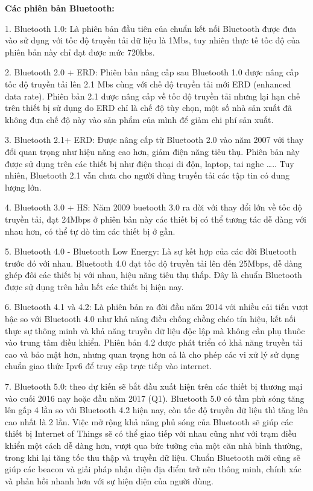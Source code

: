 \textbf{Các phiên bản Bluetooth:}

1.    Bluetooth 1.0: Là phiên bản đầu tiên của chuẩn kết nối Bluetooth được đưa vào sử dụng với tốc độ truyền tải dữ liệu là 1Mbs, tuy nhiên thực tế tốc độ của phiên bản này chỉ đạt được mức 720kbs.

2.    Bluetooth 2.0 + ERD: Phiên bản nâng cấp sau Bluetooth 1.0 được nâng cấp tốc độ truyền tải lên 2.1 Mbs cùng với chế độ truyền tải mới ERD (enhanced data rate). Phiên bản 2.1 được nâng cấp về tốc độ truyền tải nhưng lại hạn chế trên thiết bị sử dụng do ERD chỉ là chế độ tùy chọn, một số nhà sản xuất đã không đưa chế độ này vào sản phẩm của mình để giảm chi phí sản xuất.

3.    Bluetooth 2.1+ ERD: Được nâng cấp từ Bluetooth 2.0 vào năm 2007 với thay đổi quan trọng như hiệu năng cao hơn, giảm điện năng tiêu thụ. Phiên bản này được sử dụng trên các thiết bị như điện thoại di độn, laptop, tai nghe ….. Tuy nhiên, Bluetooth 2.1 vẫn chưa cho người dùng truyền tải các tập tin có dung lượng lớn.

4.    Bluetooth 3.0 + HS: Năm 2009 buetooth 3.0 ra đời với thay đổi lớn về tốc độ truyền tải, đạt 24Mbps ở phiên bản này các thiết bị có thể tương tác dễ dàng với nhau hơn, có thể tự dò tìm các thiết bị ở gần.

5.    Bluetooth 4.0 - Bluetooth Low Energy: Là sự kết hợp của các đời Bluetooth trước đó với nhau. Bluetooth 4.0 đạt tốc độ truyền tải lên đến 25Mbps, dễ dàng ghép đôi các thiết bị với nhau, hiệu năng tiêu thụ thấp. Đây là chuẩn Bluetooth được sử dụng trên hầu hết các thiết bị hiện nay.

6.    Bluetooth 4.1 và 4.2: Là phiên bản ra đời đầu năm 2014 với nhiều cải tiến vượt bậc so với Bluetooth 4.0 như khả năng điều chống chồng chéo tín hiệu, kết nối thực sự thông minh và khả năng truyền dữ liệu độc lập mà không cần phụ thuôc vào trung tâm điều khiển. Phiên bản 4.2 được phát triển có khả năng truyền tải cao và bảo mật hơn, nhưng quan trọng hơn cả là cho phép các vi xử lý sử dụng chuẩn giao thức Ipv6 để truy cập trực tiếp vào internet.

7.	Bluetooth 5.0: theo dự kiến sẽ bắt đầu xuất hiện trên các thiết bị thương mại vào cuối 2016 nay hoặc đầu năm 2017 (Q1). Bluetooth 5.0 có tầm phủ sóng tăng lên gấp 4 lần so với Bluetooth 4.2 hiện nay, còn tốc độ truyền dữ liệu thì tăng lên cao nhất là 2 lần. Việc mở rộng khả năng phủ sóng của Bluetooth sẽ giúp các thiết bị Internet of Things sẽ có thể giao tiếp với nhau cũng như với trạm điều khiển một cách dễ dàng hơn, vượt qua bức tường của một căn nhà bình thường, trong khi lại tăng tốc thu thập và truyền dữ liệu. Chuẩn Bluetooth mới cũng sẽ giúp các beacon và giải pháp nhận diện địa điểm trở nên thông minh, chính xác và phản hồi nhanh hơn với sự hiện diện của người dùng.

